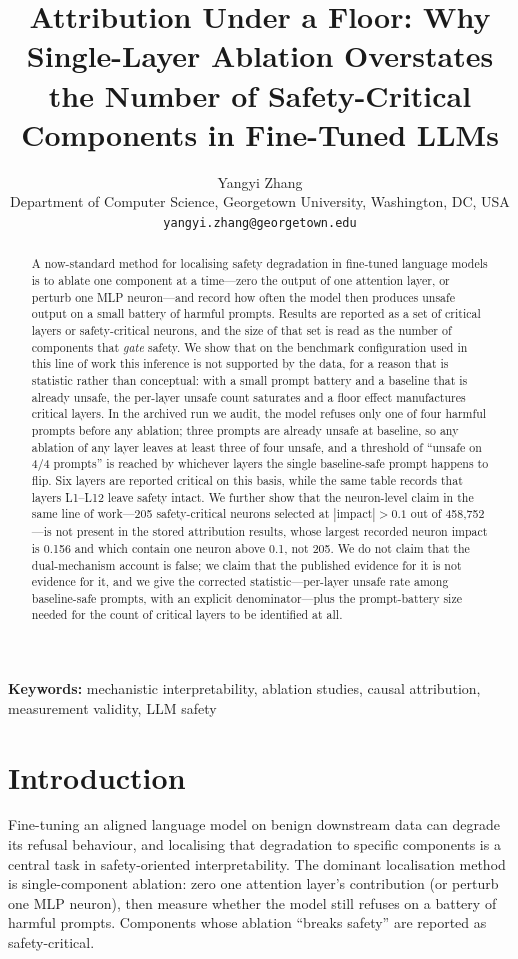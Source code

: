 \documentclass[11pt]{article}
\title{\bfseries Attribution Under a Floor: Why Single-Layer Ablation Overstates the Number of Safety-Critical Components in Fine-Tuned LLMs}
\author{Yangyi Zhang\\ Department of Computer Science, Georgetown University, Washington, DC, USA\\ \texttt{yangyi.zhang@georgetown.edu}}
\date{}
\begin{document}
\maketitle

\begin{abstract}
\noindent
A now-standard method for localising safety degradation in fine-tuned language models is to ablate one component at a time---zero the output of one attention layer, or perturb one MLP neuron---and record how often the model then produces unsafe output on a small battery of harmful prompts. Results are reported as a set of critical layers or safety-critical neurons, and the size of that set is read as the number of components that \emph{gate} safety. We show that on the benchmark configuration used in this line of work this inference is not supported by the data, for a reason that is statistic rather than conceptual: with a small prompt battery and a baseline that is already unsafe, the per-layer unsafe count saturates and a floor effect manufactures critical layers. In the archived run we audit, the model refuses only one of four harmful prompts before any ablation; three prompts are already unsafe at baseline, so any ablation of any layer leaves at least three of four unsafe, and a threshold of ``unsafe on 4/4 prompts'' is reached by whichever layers the single baseline-safe prompt happens to flip. Six layers are reported critical on this basis, while the same table records that layers L1--L12 leave safety intact. We further show that the neuron-level claim in the same line of work---205 safety-critical neurons selected at $|\text{impact}|>0.1$ out of 458{,}752---is not present in the stored attribution results, whose largest recorded neuron impact is 0.156 and which contain one neuron above 0.1, not 205. We do not claim that the dual-mechanism account is false; we claim that the published evidence for it is not evidence for it, and we give the corrected statistic---per-layer unsafe rate among baseline-safe prompts, with an explicit denominator---plus the prompt-battery size needed for the count of critical layers to be identified at all.
\end{abstract}

\noindent\textbf{Keywords:} mechanistic interpretability, ablation studies, causal attribution, measurement validity, LLM safety

\section{Introduction}
Fine-tuning an aligned language model on benign downstream data can degrade its refusal behaviour, and localising that degradation to specific components is a central task in safety-oriented interpretability. The dominant localisation method is single-component ablation: zero one attention layer's contribution (or perturb one MLP neuron), then measure whether the model still refuses on a battery of harmful prompts. Components whose ablation ``breaks safety'' are reported as safety-critical.
\end{document}
